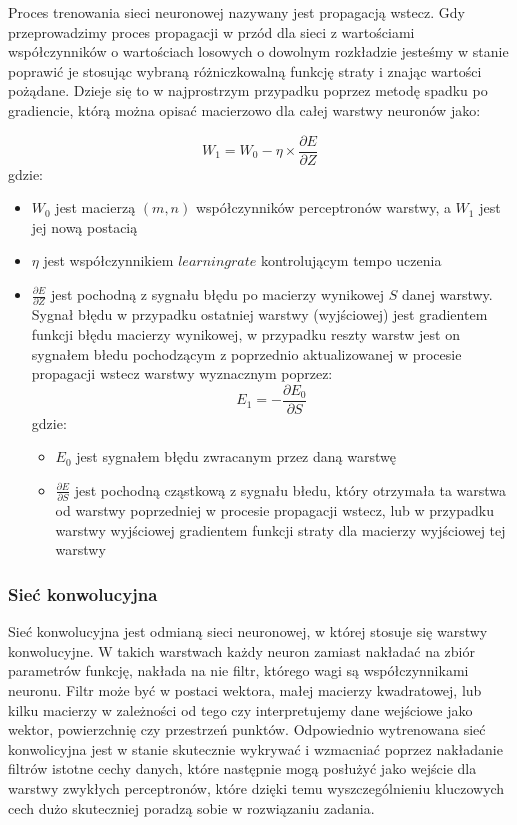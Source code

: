 \documentclass{article}
\begin{document}
Proces trenowania sieci neuronowej nazywany jest propagacją wstecz. Gdy 
przeprowadzimy proces propagacji w przód dla sieci z wartościami współczynników
o wartościach losowych o dowolnym rozkładzie jesteśmy w stanie poprawić 
je stosując wybraną różniczkowalną funkcję straty i znając wartości pożądane. Dzieje się to 
w najprostrzym przypadku poprzez metodę spadku po gradiencie, którą można 
opisać macierzowo dla całej warstwy neuronów jako:

\begin{equation}
    W_1 = W_0 - \eta \times \frac{\partial E}{\partial Z}
\end{equation}
gdzie:
\begin{itemize}
    \item $W_0$ jest macierzą $(m, n)$ współczynników perceptronów warstwy, a $W_1$ jest jej nową postacią
    \item $\eta$ jest współczynnikiem $learning rate$ kontrolującym tempo uczenia
    \item $\frac{\partial E}{\partial Z}$ jest pochodną z sygnału błędu po 
    macierzy wynikowej $S$ danej warstwy. Sygnał błędu w przypadku ostatniej warstwy (wyjściowej) jest
    gradientem funkcji błędu macierzy wynikowej, w przypadku reszty warstw 
    jest on sygnałem błedu pochodzącym z poprzednio aktualizowanej w procesie propagacji wstecz warstwy
    wyznacznym poprzez:
    \begin{equation}
        E_1 = -\frac{\partial E_0}{\partial S}
    \end{equation}
    gdzie:
    \begin{itemize}
        \item $E_0$ jest sygnałem błędu zwracanym przez daną warstwę
        \item $\frac{\partial E}{\partial S}$ jest pochodną cząstkową z sygnału błedu, 
        który otrzymała ta warstwa od warstwy poprzedniej w procesie propagacji wstecz, lub w przypadku warstwy
        wyjściowej gradientem funkcji straty dla macierzy wyjściowej tej warstwy
    \end{itemize}
\end{itemize}

\subsubsection{Sieć konwolucyjna}
Sieć konwolucyjna jest odmianą sieci neuronowej, 
w której stosuje się warstwy konwolucyjne. W takich 
warstwach każdy neuron zamiast nakładać na zbiór parametrów 
funkcję, nakłada na nie filtr, którego wagi są współczynnikami 
neuronu. Filtr może być w postaci wektora, małej macierzy kwadratowej, 
lub kilku macierzy w zależności od tego czy interpretujemy dane wejściowe 
jako wektor, powierzchnię czy przestrzeń punktów. Odpowiednio wytrenowana 
sieć konwolicyjna jest w stanie skutecznie wykrywać i wzmacniać poprzez 
nakładanie filtrów istotne cechy danych, które następnie mogą posłużyć 
jako wejście dla warstwy zwykłych perceptronów, które dzięki temu wyszczególnieniu 
kluczowych cech dużo skuteczniej poradzą sobie w rozwiązaniu zadania.
\end{document}
